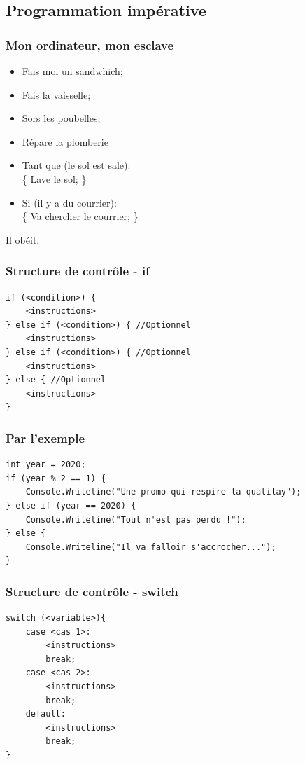 \documentclass{beamer}
\begin{document}
\subsection{Programmation impérative}

\begin{frame}[fragile]
\frametitle{Mon ordinateur, mon esclave}
\begin{itemize}
\item<+-> Fais moi un sandwhich;
\item<+-> Fais la vaisselle;
\item<+-> Sors les poubelles;
\item<+-> Répare la plomberie
\item<+-> Tant que (le sol est sale):\\
	\{ Lave le sol; \}
\item<+-> Si (il y a du courrier):\\
	\{ Va chercher le courrier; \}
\end{itemize}
\pause
Il obéit.
\end{frame}

\begin{frame}[fragile]
\frametitle{Structure de contrôle - if}
\begin{lstlisting}
if (<condition>) {
    <instructions>
} else if (<condition>) { //Optionnel
    <instructions>
} else if (<condition>) { //Optionnel
    <instructions>
} else { //Optionnel
    <instructions>
}
\end{lstlisting}
\end{frame}

\begin{frame}[fragile]
\frametitle{Par l'exemple}
\begin{lstlisting}
int year = 2020;
if (year % 2 == 1) {
    Console.Writeline("Une promo qui respire la qualitay");
} else if (year == 2020) {
    Console.Writeline("Tout n'est pas perdu !");
} else {
    Console.Writeline("Il va falloir s'accrocher...");
}
\end{lstlisting}
\end{frame}

\begin{frame}[fragile]
\frametitle{Structure de contrôle - switch}
\begin{lstlisting}
switch (<variable>){
    case <cas 1>:
        <instructions>
        break;
    case <cas 2>:
        <instructions>
        break;
    default:
        <instructions>
        break;
}
\end{lstlisting}
\end{frame}
\end{document}
